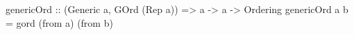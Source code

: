 \begin{code}
genericOrd :: (Generic a, GOrd (Rep a)) => a -> a -> Ordering
genericOrd a b = gord (from a) (from b)
\end{code}
